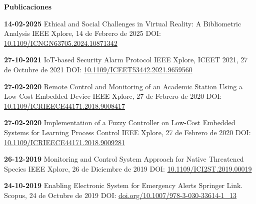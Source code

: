 \pagestyle{empty}
\begin{mainbar}
    \textbf{Publicaciones}
\end{mainbar}



\begin{levent}
    \cvevent
	{\textbf{14-02-2025}}
	{Ethical and Social Challenges in Virtual Reality: A Bibliometric Analysis}
	{IEEE Xplore, 14 de Febrero de 2025}
	{DOI: \href{https://ieeexplore.ieee.org/document/10871342}{10.1109/ICNGN63705.2024.10871342} }
	{}
\end{levent}


\begin{levent}
    \cvevent
	{\textbf{27-10-2021}}
	{IoT-based Security Alarm Protocol}
	{IEEE Xplore, ICEET 2021, 27 de Octubre de 2021}
	{DOI: \href{https://ieeexplore.ieee.org/document/9659560}{10.1109/ICEET53442.2021.9659560} }
	{}
\end{levent}
\begin{devent}
    \cvevent
	{\textbf{27-02-2020}}
	{Remote Control and Monitoring of an Academic Station Using a Low-Cost Embedded Device}
	{IEEE Xplore, 27 de Febrero de 2020}
	{DOI: \href{https://ieeexplore.ieee.org/document/9008417}{10.1109/ICRIEECE44171.2018.9008417}}
	{}
\end{devent}
\begin{levent}
    \cvevent
	{\textbf{27-02-2020}}
	{Implementation of a Fuzzy Controller on Low-Cost Embedded 
Systems for Learning Process Control}
	{IEEE Xplore, 27 de Febrero de 2020}
	{DOI: \href{https://ieeexplore.ieee.org/document/9009281}{10.1109/ICRIEECE44171.2018.9009281}}
	{}
\end{levent}
\begin{devent}
    \cvevent
	{\textbf{26-12-2019}}
	{Monitoring and Control System Approach for Native Threatened Species}
	{IEEE Xplore, 26 de Diciembre de 2019}
	{DOI: \href{https://ieeexplore.ieee.org/document/8940400}{10.1109/ICI2ST.2019.00019}}
	{}
\end{devent}
\begin{levent}
    \cvevent
	{\textbf{24-10-2019}}
	{Enabling Electronic System for Emergency Alerts}
	{Springer Link. Scopus, 24 de Octubre de 2019}
	{DOI: \href{https://link.springer.com/chapter/10.1007/978-3-030-33614-1\_13}{doi.org/10.1007/978-3-030-33614-1\_13}}
	{}
\end{levent}


